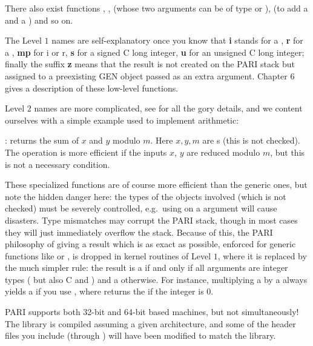 \noindent
There also exist functions , ,  (whose
two arguments can be of type  or ),  (to add a
 and a ) and so on.

The Level $1$ names are self-explanatory once you know that {\bf i} stands for a
, {\bf r} for a , {\bf mp} for i or r, {\bf s} for a signed C
long integer, {\bf u} for an unsigned C long integer; finally the suffix {\bf z}
means that the result is not created on the PARI stack but assigned to a
preexisting GEN object passed as an extra argument. Chapter 6 gives a
description of these low-level functions.

Level $2$ names are more complicated, see  for all the
gory details, and we content ourselves with a simple example used to implement
 arithmetic:

: returns the sum of $x$ and $y$ modulo
$m$. Here $x, y, m$ are s (this is not checked). The operation is
more efficient if the inputs $x$, $y$ are reduced modulo $m$, but this is not
a necessary condition.

 These specialized functions are of course more
efficient than the generic ones, but note the hidden danger here: the types
of the objects involved (which is not checked) must be severely controlled,
e.g.~using  on a  argument will cause disasters. Type
mismatches may corrupt the PARI stack, though in most cases they will just
immediately overflow the stack. Because of this, the PARI philosophy of
giving a result which is as exact as possible, enforced for generic functions
like  or , is dropped in kernel routines of Level $1$,
where it is replaced by the much simpler rule: the result is a  if
and only if all arguments are integer types ( but also C 
and ) and a  otherwise. For instance, multiplying a
 by a  always yields a  if you use ,
where  returns the   if the integer is $0$.


\noindent
PARI supports both 32-bit and 64-bit based machines, but not simultaneously!
The library is compiled assuming a given architecture, and some
of the header files you include (through ) will have been
modified to match the library.

